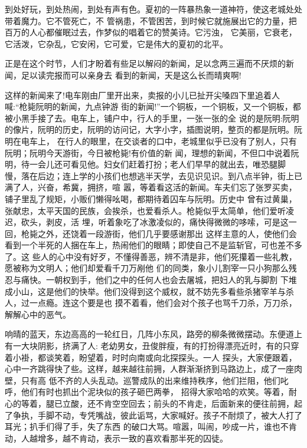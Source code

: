 \documentclass[11pt,a4paper,onecolumn]{article}
\begin{document}
到处好玩，到处热闹，到处有声有色。夏初的一阵暴热象一道神符，使这老城处处带着魔力。它不管死亡，不
管祸患，不管困苦，到时候它就施展出它的力量，把百万的人心都催眠过去，作梦似的唱着它的赞美诗。它污浊，
它美丽，它衰老，它活泼，它杂乱，它安闲，它可爱，它是伟大的夏初的北平。

正是在这个时节，人们才盼着有些足以解闷的新闻，足以念两三遍而不厌烦的新闻，足以读完报而可以亲身去
看到的新闻，天是这么长而晴爽啊!

这样的新闻来了!电车刚由厂里开出来，卖报的小儿已扯开尖嗓四下里追着人喊:``枪毙阮明的新闻，九点钟游
街的新闻!''一个铜板，一个铜板，又一个铜板，都被小黑手接了去。电车上，铺户中，行人的手里，一张一张的全
说的是阮明:阮明的像片，阮明的历史，阮明的访问记，大字小字，插图说明，整页的都是阮明。阮明在电车上，
在行人的眼里，在交谈者的口中，老城里似乎已没有了别人，只有阮明；阮明今天游街，今日被枪毙!有价值的新
闻，理想的新闻，不但口中说着阮明，待一会儿还可看见他。妇女们赶着打扮；老人们早早的就出去，唯恐腿脚
慢，落在后边；连上学的小孩们也想逃半天学，去见识见识。到八点半钟，街上已满了人，兴奋，希冀，拥挤，喧
嚣，等着看这活的新闻。车夫们忘了张罗买卖，铺子里乱了规矩，小贩们懒得吆喝，都期待着囚车与阮明。历史中
曾有过黄巢，张献忠，太平天国的民族，会挨杀，也爱看杀人。枪毙似乎太简单，他们爱听凌迟，砍头，剥皮，活
埋，听着象吃了冰激凌似的，痛快得微微的哆嗦，可是这一回，枪毙之外，还饶着一段游街，他们几乎要感谢那出
这样主意的人，使他们会看到一个半死的人捆在车上，热闹他们的眼睛；即使自己不是监斩官，可也差不多了。这
些人的心中没有好歹，不懂得善恶，辨不清是非，他们死攥着一些礼教，愿被称为文明人；他们却爱看千刀万剐他
们的同类，象小儿割宰一只小狗那么残忍与痛快。一朝权到手，他们之中的任何人也会去屠城，把妇人的乳与脚割
下堆成小山，这是他们的快举。他们没得到这个威权，就不妨先多看些杀猪宰羊与杀人，过一点瘾。连这个要是也
摸不着看，他们会对个孩子也骂千刀杀，万刀杀，解解心中的恶气。

响晴的蓝天，东边高高的一轮红日，几阵小东风，路旁的柳条微微摆动。东便道上有一大块阴影，挤满了人:
老幼男女，丑俊胖瘦，有的打扮得漂亮近时，有的只穿着小褂，都谈笑着，盼望着，时时向南或向北探探头。一人
探头，大家便跟着，心中一齐跳得快了些。这样，越来越往前拥，人群渐渐挤到马路边上，成了一座肉壁，只有高
低不齐的人头乱动。巡警成队的出来维持秩序，他们拦阻，他们叱呼，他们有时也抓出个泥块似的孩子砸巴两拳，
招得大家哈哈的欢笑。等着，耐心的等着，腿已立酸，还不肯空空回去；前头的不肯走，后面新来的便往前拥，起
了争执，手脚不动，专凭嘴战，彼此诟骂，大家喊好。孩子不耐烦了，被大人打了耳光；扒手们得了手，失了东西
的破口大骂。喧嚣，叫闹，吵成一片，谁也不肯动，人越增多，越不肯动，表示一致的喜欢看那半死的囚徒。
\end{document}
